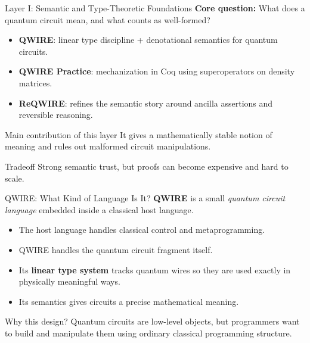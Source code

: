 \documentclass[aspectratio=169]{beamer}
\begin{document}
\begin{frame}{Layer I: Semantic and Type-Theoretic Foundations}
\justifying
\textbf{Core question:} What does a quantum circuit mean, and what counts as well-formed?

\vspace{0.5em}
\begin{itemize}
    \item \textbf{QWIRE}: linear type discipline + denotational semantics for quantum circuits.
    \item \textbf{QWIRE Practice}: mechanization in Coq using superoperators on density matrices.
    \item \textbf{ReQWIRE}: refines the semantic story around ancilla assertions and reversible reasoning.
\end{itemize}

\pause

\begin{block}{Main contribution of this layer}
It gives a mathematically stable notion of meaning and rules out malformed circuit manipulations.
\end{block}

\pause

\begin{alertblock}{Tradeoff}
Strong semantic trust, but proofs can become expensive and hard to scale.
\end{alertblock}
\end{frame}
\begin{frame}{QWIRE: What Kind of Language Is It?}
\justifying
\textbf{QWIRE} is a small \emph{quantum circuit language} embedded inside a classical host language.

\vspace{0.7em}
\begin{itemize}
    \item The host language handles classical control and metaprogramming.
    \item QWIRE handles the quantum circuit fragment itself.
    \item Its \textbf{linear type system} tracks quantum wires so they are used exactly in physically meaningful ways.
    \item Its semantics gives circuits a precise mathematical meaning.
\end{itemize}

\vspace{0.7em}
\begin{block}{Why this design?}
Quantum circuits are low-level objects, but programmers want to build and manipulate them using ordinary classical programming structure.
\end{block}
\end{frame}
\end{document}
